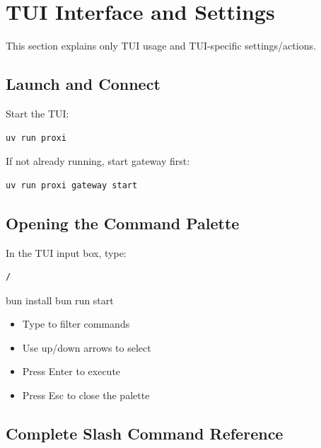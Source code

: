 \documentclass{article}
\begin{document}
\section{TUI Interface and Settings}

This section explains only TUI usage and TUI-specific settings/actions.

\subsection{Launch and Connect}

Start the TUI:
\begin{verbatim}
uv run proxi
\end{verbatim}

If not already running, start gateway first:
\begin{verbatim}
uv run proxi gateway start
\end{verbatim}

\subsection{Opening the Command Palette}

In the TUI input box, type:
\begin{verbatim}
/
\end{verbatim}
bun install
bun run start
\begin{itemize}
	\item Type to filter commands
	\item Use up/down arrows to select
	\item Press Enter to execute
	\item Press Esc to close the palette
\end{itemize}

\subsection{Complete Slash Command Reference}
\end{document}
